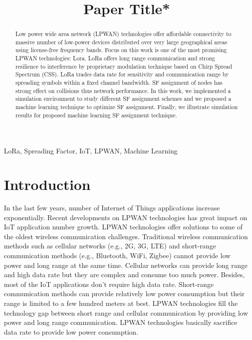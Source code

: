 \documentclass[conference]{IEEEtran}
\begin{document}
\title{Paper Title*\\
}


\author{
}
\maketitle


\begin{abstract}
Low power wide area network (LPWAN) technologies offer affordable connectivity to massive number of low-power devices distributed over very large geographical areas using license-free frequency bands. Focus on this work is one of the most promising LPWAN technologies: Lora. LoRa offers long range communication and strong resilience to interference by proprietary modulation technique based on Chirp Spread Spectrum (CSS). LoRa trades data rate for sensitivity and communication range by spreading symbols within a fixed channel bandwidth. SF assignment of nodes has strong effect on collisions thus network performance. In this work, we implemented a simulation environment to study different SF assignment schemes and we proposed a machine learning technique to optimize SF assignment. Finally, we illustrate simulation results for proposed machine learning SF assignment technique.
\end{abstract}


\begin{IEEEkeywords}
LoRa, Spreading Factor, IoT, LPWAN, Machine Learning
\end{IEEEkeywords}


\section{Introduction}
\par In the last few years, number of Internet of Things applications increase exponentially. \cite{7721743} Recent developments on LPWAN technologies has great impact on IoT application number growth. LPWAN technologies offer solutions to some of the oldest wireless communication challenges. Traditional wireless communication methods such as cellular networks (e.g., 2G, 3G, LTE) and short-range communication methods (e.g., Bluetooth, WiFi, Zigbee) cannot provide low power and long range at the same time. Cellular networks can provide long range and high data rate but they are complex and consume too much power. Besides, most of the IoT applications don't require high data rate. Short-range communication methods can provide relatively low power consumption but their range is limited to a few hundred meters at best. \cite{7815384} LPWAN technologies fill the technology gap between short range and cellular communication by providing low power and long range communication. LPWAN technologies basically sacrifice data rate to provide low power consumption.
\end{document}
